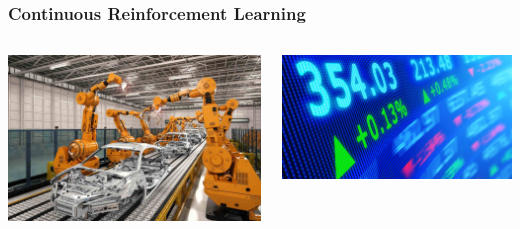 \documentclass[aspectratio=169, table]{beamer}
\begin{document}
\begin{frame}
\frametitle{Continuous Reinforcement Learning}
\begin{columns}
		\begin{column}{.4\textwidth}
			\includegraphics[width=\textwidth]{robots.jpeg}
		\end{column}
	\hfill
			\begin{column}{.5\textwidth}
			\includegraphics[width=\textwidth]{finance.jpg}
		\end{column}
\end{columns}
\end{frame}
\end{document}
